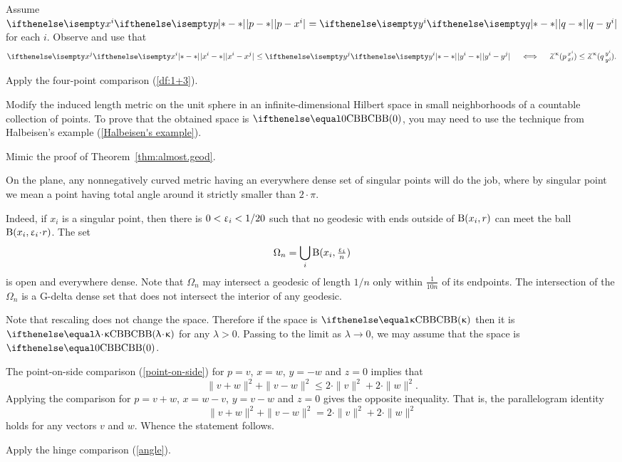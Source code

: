 Assume $\dist{p}{x^i}{}=\dist{q}{y^i}{}$ for each $i$.
Observe and use that
\[\dist{x^i}{x^j}{}\le\dist{y^i}{y^j}{}
\quad\iff\quad
\angk\kappa p{x^i}{x^j}\le \angk\kappa q{y^i}{y^j}.\]

 Apply the four-point comparison (\ref{df:1+3}).

Modify the induced length metric on the unit sphere in an infinite-dimensional Hilbert space in small neighborhoods of a countable collection of points.
To prove that the obtained space is $\Alex0$, you may need to use the technique from Halbeisen's example (\ref{Halbeisen's example}).

 Mimic the proof of Theorem~\ref{thm:almost.geod}.

On the plane, any nonnegatively curved metric having an everywhere dense set of singular points will do the job, where 
by singular point we mean a point having total angle around it strictly smaller than $2\cdot\pi$.

Indeed, if $x_i$ is a singular point, then there is $0<\upvarepsilon_i<1/20$ such that no geodesic with ends outside of $\mathrm{B}{}(x_i,r)$ can meet the ball $\oBall(x_i,\eps_i\cdot r)$.
The set 
\[\Omega_n=\bigcup_i \mathrm{B}{}(x_i,\tfrac{\upvarepsilon_i}n)\]
is open and everywhere dense.
Note that $\Omega_n$ may intersect a geodesic  of length $1/n$ only within $\frac 1 {10n}$  of its endpoints.
The intersection of the $\Omega_n$ is a G-delta dense set that does not intersect the interior of any geodesic.

Note that rescaling does not change the space.
Therefore if the space is $\Alex\kappa$ then it is $\Alex{\lambda\cdot\kappa}$ for any $\lambda>0$.
Passing to the limit as $\lambda\to 0$, we may assume that the space is $\Alex0$.

The point-on-side comparison (\ref{point-on-side}) for $p=v$, $x=w$, $y=-w$ and $z=0$ implies that 
\[\|v+w\|^2+\|v-w\|^2\le 2\cdot\|v\|^2+2\cdot\|w\|^2.\]
Applying the comparison for 
$p=v+w$, $x=w-v$, $y=v-w$ and $z=0$ gives the opposite inequality.
That is, the parallelogram identity
\[\|v+w\|^2+\|v-w\|^2= 2\cdot\|v\|^2+2\cdot\|w\|^2\]
holds for any vectors $v$ and $w$.
Whence the statement follows.

Apply the hinge comparison (\ref{angle}).

